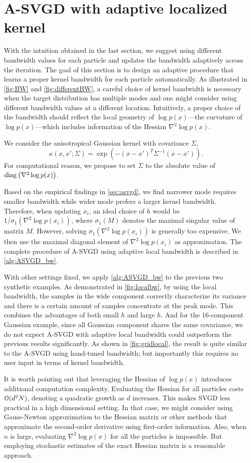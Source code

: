 \section{A-SVGD with adaptive localized kernel} \label{sec:bw}
With the intuition obtained in the last section, we suggest using different bandwidth values for each particle and updates the bandwidth adaptively across the iteration.
The goal of this section is to design an adaptive procedure that learns a proper kernel bandwidth for each particle automatically.    
As illustrated in \cref{fig:BW} and \cref{fig:differentBW}, a careful choice of kernel bandwidth is necessary when the target distribution has multiple modes and one might consider using different bandwidth values at a different location.  Intuitively, a proper choice of the bandwidth should reflect the local geometry of   $\log p(x)$---the curvature of $\log p(x)$---which includes information of the Hessian $\nabla^2 \log p(x)$.  

We consider the anisotropical Gaussian kernel with covariance $\Sigma$,
\[
\kappa(x, x'; \Sigma) = \exp(-(x - x')^T \Sigma^{-1}(x- x')  ).  
\]
For computational reason, we propose to set $\Sigma $ to the absolute value of $\operatorname{diag} \left(\nabla^2 \log p(x) \right)$.


Based on the empirical findings in \cref{sec:asvgd}, we find narrower mode requires smaller bandwidth while wider mode prefers a larger kernel bandwidth. 
Therefore, when updating $x_i$, an ideal choice of $h$ would be $1/ \sigma_1(\nabla^2 \log p(x_i))$, where $\sigma_1(M)$ denotes the maximal singular value of matrix $M$. However, solving  $\sigma_1(\nabla^2 \log p(x_i))$ is generally too expensive. We then use the maximal diagonal element of $\nabla^2 \log p(x_i)$ as approximation. The complete procedure of A-SVGD using adaptive local bandwidth is described in \cref{alg:ASVGD_bw}.

With other settings fixed, we apply \cref{alg:ASVGD_bw} to the previous two synthetic examples. As demonstrated in \cref{fig:localbw}, by using the local bandwidth, the samples in the wide component correctly characterize its variance and there is a certain amount of samples concentrate at the peak mode. This combines the advantages of both small $h$ and large $h$. And for the 16-component Gaussian example, since all Gaussian component shares the same covariance, we do not expect  A-SVGD with adaptive local bandwidth could outperform the previous results significantly. As shown in \cref{fig:gridlocal}, the result is quite similar to the A-SVGD using hand-tuned bandwidth; but importantly this  requires no user input in terms of kernel bandwidth.

It is worth pointing out that leveraging the Hessian of $\log p(x)$ introduces additional computation complexity. Evaluating the Hessian for all particles costs $\mathcal{O}(d^2N)$, denoting a quadratic growth as $d$ increases. This makes SVGD less practical in a high dimensional setting. In that case, we might consider using Gauss-Newton approximation to the Hessian matrix or other methods that approximate the second-order derivative using first-order information.
Also, when $n$ is large, evaluating $\nabla^2 \log p(x)$ for all the particles is impossible. But employing  stochastic estimates of the exact Hessian matrix is a reasonable approach.  